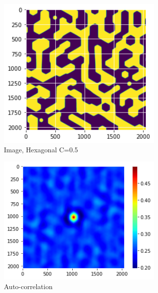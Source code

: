 \documentclass[12pt, a4paper]{report}
\begin{document}
\begin{figure}[H]
\centering
\begin{subfigure}{.32\textwidth}
  \centering
  \includegraphics[width=0.9\textwidth]{Pictures/MSFeatures/CorrHexaImage.png}
  \caption{Image, Hexagonal C=0.5}
  \label{img:microstrImg}
\end{subfigure}
\begin{subfigure}{.32\textwidth}
  \centering
  \includegraphics[width=0.9\textwidth]{Pictures/MSFeatures/CorrHexaAuto.png}
  \caption{Auto-correlation}
  \label{img:microstrImg}
\end{subfigure}
\begin{subfigure}{.32\textwidth}

\end{subfigure}
\end{figure}
\end{document}
